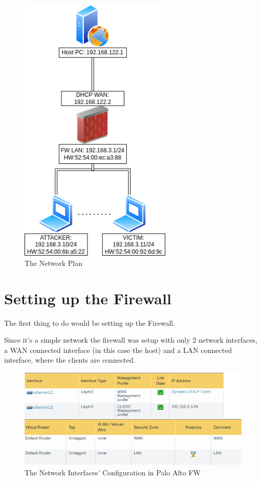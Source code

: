 \begin{figure}[h!]
 \centering
 \includegraphics[height=13cm]{img/Network_Plan.png}
 \caption{The Network Plan}
 \label{fig: network-plan}
\end{figure}



\newpage

\section{Setting up the Firewall}

The first thing to do would be setting up the Firewall.

Since it's a simple network the firewall was setup with only 2 network interfaces, a WAN connected interface (in this case the host) and a LAN connected interface, where the clients are connected.

\begin{figure}[!hb]
 \centering
 \includegraphics[width=13cm]{img/network_config.png}
 \caption{The Network Interfaces' Configuration in Palo Alto FW}
 \label{Network Interfaces Configuration}
\end{figure}


